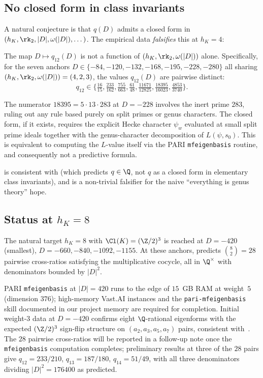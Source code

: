 \subsection{No closed form in class invariants}
\label{ss:no-closed-form}

A natural conjecture is that $q(D)$ admits a closed form in
$(h_K, \rk_2, |D|, \omega(|D|), \dots)$. The empirical data
\emph{falsifies} this at $h_K = 4$:

\begin{corollary}
\label{cor:no-closed-empirical}
The map $D \mapsto q_{12}(D)$ is not a function of $(h_K, \rk_2,
\omega(|D|))$ alone. Specifically, for the seven anchors $D \in
\{-84, -120, -132, -168, -195, -228, -280\}$ all sharing
$(h_K, \rk_2, \omega(|D|)) = (4, 2, 3)$, the values $q_{12}(D)$
are pairwise distinct:
\[
q_{12} \in \bigl\{\tfrac{16}{15}, \tfrac{233}{162},
\tfrac{755}{663}, \tfrac{61}{48}, \tfrac{11671}{12825},
\tfrac{18395}{16023}, \tfrac{4853}{3740}\bigr\}.
\]
\end{corollary}

The numerator $18395 = 5 \cdot 13 \cdot 283$ at $D = -228$
involves the inert prime $283$, ruling out any rule based purely
on split primes or genus characters. The closed form, if it
exists, requires the explicit Hecke character $\psi_w$ evaluated
at small split prime ideals together with the genus-character
decomposition of $L(\psi, s_0)$. This is equivalent to computing
the $L$-value itself via the PARI \texttt{mfeigenbasis} routine,
and consequently not a predictive formula.

 is consistent with
 (which predicts $q \in \Q$, not $q$ as a closed
form in elementary class invariants), and is a non-trivial
falsifier for the naive ``everything is genus theory'' hope.

\subsection{Status at $h_K = 8$}\label{ss:h8-status}

The natural target $h_K = 8$ with $\Cl(K) = (\Z/2)^3$ is reached
at $D = -420$ (smallest), $D = -660, -840, -1092, -1155$. At
these anchors,  predicts $\binom{8}{2} = 28$
pairwise cross-ratios satisfying the multiplicative cocycle, all
in $\Q^\times$ with denominators bounded by $|D|^2$.

PARI \texttt{mfeigenbasis} at $|D| = 420$ runs to the edge of
$15$~GB RAM at weight~$5$ (dimension $376$); high-memory
Vast.AI instances and the \texttt{pari-mfeigenbasis} skill
documented in our project memory are required for completion.
Initial weight-$3$ data at $D = -420$ confirms eight
$\Q$-rational eigenforms with the expected
$(\Z/2)^3$ sign-flip structure on $(a_2, a_3, a_5, a_7)$ pairs,
consistent with~. The $28$ pairwise cross-ratios
will be reported in a follow-up note once the
\texttt{mfeigenbasis} computation completes; preliminary
results at three of the $28$ pairs give $q_{12} = 233/210$,
$q_{13} = 187/180$, $q_{14} = 51/49$, with all three denominators
dividing $|D|^2 = 176400$ as predicted.

